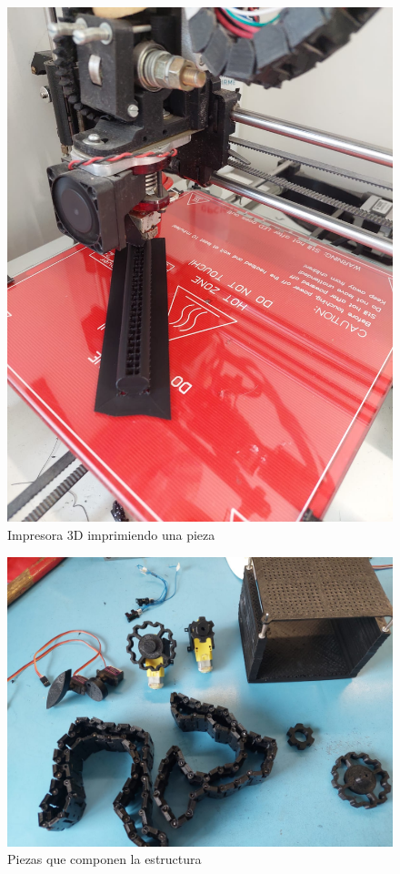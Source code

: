 \documentclass[12pt,letterpaper]{article}     %
\begin{document}
\begin{figure}[!ht]
\centering
\includegraphics[scale=0.2]{imagenes/Impresora.jpeg}
\caption{Impresora 3D imprimiendo una pieza}
\label{fig:impresora}
\end{figure}

\begin{figure}[!ht]
\centering
\includegraphics[scale=0.2]{imagenes/Piezas.jpeg}
\caption{Piezas que componen la estructura}
\label{fig:piezas}
\end{figure}
\end{document}
